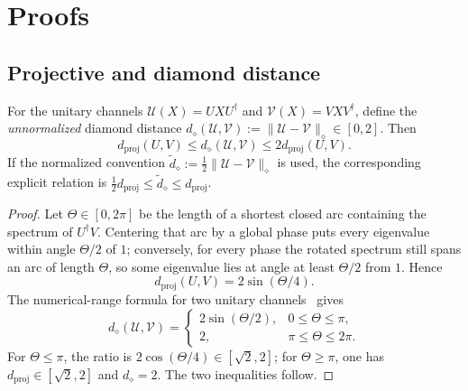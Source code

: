 \section{Proofs}
\label{app:proofs}

\subsection{Projective and diamond distance}

\begin{lemma}
\label{lem:diamond-comparison}
For the unitary channels
$\mathcal U(X)=UXU^\dagger$ and $\mathcal V(X)=VXV^\dagger$, define the
\emph{unnormalized} diamond distance
$d_\diamond(\mathcal U,\mathcal V)
:=\|\mathcal U-\mathcal V\|_\diamond\in[0,2]$.  Then
\begin{equation*}
 d_{\mathrm{proj}}(U,V)
 \leq d_\diamond(\mathcal U,\mathcal V)
 \leq 2d_{\mathrm{proj}}(U,V).
\end{equation*}
If the normalized convention
$\widetilde d_\diamond:=\tfrac12\|\mathcal U-\mathcal V\|_\diamond$ is used,
the corresponding explicit relation is
$\tfrac12d_{\mathrm{proj}}\leq\widetilde d_\diamond\leq
d_{\mathrm{proj}}$.
\end{lemma}

\begin{proof}
Let $\Theta\in[0,2\pi]$ be the length of a shortest closed arc containing
the spectrum of $U^\dagger V$.  Centering that arc by a global phase puts
every eigenvalue within angle $\Theta/2$ of $1$; conversely, for every
phase the rotated spectrum still spans an arc of length $\Theta$, so some
eigenvalue lies at angle at least $\Theta/2$ from $1$.  Hence
\begin{equation*}
 d_{\mathrm{proj}}(U,V)=2\sin(\Theta/4).
\end{equation*}
The numerical-range formula for two unitary
channels~\cite{watrous2018theory} gives
\begin{equation*}
 d_\diamond(\mathcal U,\mathcal V)=
 \begin{cases}
  2\sin(\Theta/2),&0\leq\Theta\leq\pi,\\
  2,&\pi\leq\Theta\leq2\pi.
 \end{cases}
\end{equation*}
For $\Theta\leq\pi$, the ratio is $2\cos(\Theta/4)\in[\sqrt2,2]$;
for $\Theta\geq\pi$, one has
$d_{\mathrm{proj}}\in[\sqrt2,2]$ and $d_\diamond=2$.  The two inequalities
follow.
\end{proof}

